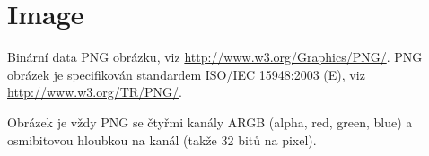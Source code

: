 \section{Image}
\label{connection.data_types.image}

Binární data PNG obrázku, viz \url{http://www.w3.org/Graphics/PNG/}. PNG obrázek je specifikován standardem ISO/IEC 15948:2003 (E), viz \url{http://www.w3.org/TR/PNG/}.

Obrázek je vždy PNG se čtyřmi kanály ARGB (alpha, red, green, blue) a osmibitovou hloubkou na kanál (takže 32 bitů na pixel).
